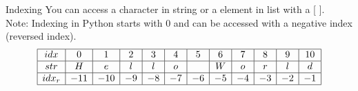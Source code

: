 \documentclass{beamer}
\begin{document}
\begin{frame}{}
    \begin{block}{Indexing}
        You can access a character in string or a element in list with a [ ]. \\
        Note: Indexing in Python starts with 0 and can be accessed with a negative index (reversed index).
        \[
            \begin{array}{|c|c|c|c|c|c|c|c|c|c|c|c|c|}
                \hline
                idx     & 0   & 1   & 2  & 3  & 4  & 5  & 6  & 7  & 8  & 9  & 10 \\
                \hline
                str     & H   & e   & l  & l  & o  & \  & W  & o  & r  & l  & d  \\
                \hline
                idx_{r} & -11 & -10 & -9 & -8 & -7 & -6 & -5 & -4 & -3 & -2 & -1 \\
                \hline
            \end{array}
        \]
        

    \end{block}
\end{frame}
\end{document}
